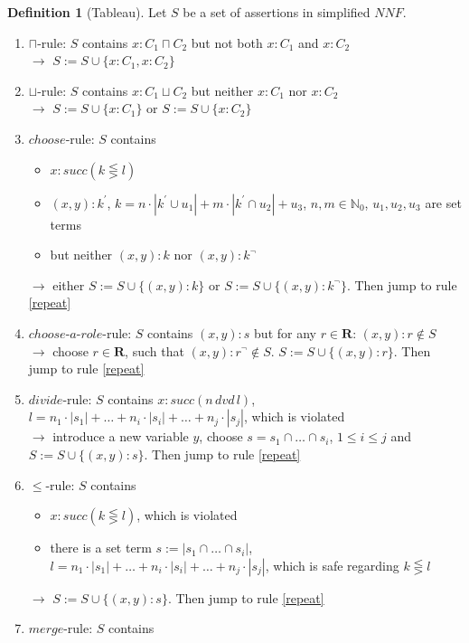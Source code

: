 \documentclass[a4paper,11pt]{scrartcl}
\theoremstyle{break}
\theoremstyle{definition}
\newtheorem{mydef}{Definition}
\begin{document}
\begin{mydef}[Tableau]
Let $S$ be a set of assertions in simplified $NNF$.
\begin{enumerate}
\item\label{cap} $\sqcap$-rule: $S$ contains $x:C_1\sqcap C_2$ but not both $x:C_1$ and $x:C_2$\\
$\rightarrow$ $S:=S\cup\{x:C_1, x:C_2\}$
\item\label{cup} $\sqcup$-rule: $S$ contains $x:C_1\sqcup C_2$ but neither $x:C_1$ nor $x:C_2$\\
$\rightarrow$ $S:=S\cup\{x:C_1\}$ or $S:=S\cup\{x:C_2\}$
\item\label{choose}$choose$-rule: $S$ contains
\begin{itemize}
\item $x:succ(k\lesseqgtr l)$
\item $(x,y):k^\prime$, $k=n\cdot|k^\prime\cup u_1|+m\cdot|k^\prime\cap u_2|+u_3$, $n,m\in\mathbb{N}_0$, $u_1,u_2,u_3$ are set terms
\item but neither $(x,y):k$ nor $(x,y):k^\neg$
\end{itemize}
$\rightarrow$ either $S:=S\cup\{(x,y):k\}$ or $S:=S\cup\{(x,y):k^\neg\}$. Then jump to rule \ref{repeat}
\item\label{chooserole}$choose$-$a$-$role$-rule: $S$ contains $(x,y):s$ but for any $r\in\mathbf{R}$: $(x,y):r\notin S$\\
$\rightarrow$ choose $r\in\mathbf{R}$, such that $(x,y):r^\neg\notin S$. $S:=S\cup\{(x,y):r\}$. Then jump to rule \ref{repeat}
\item\label{dvd}$divide$-rule: $S$ contains $x:succ(n\,dvd\,l)$, $l=n_1\cdot|s_1|+\dots+n_i\cdot|s_i|+\dots+n_j\cdot|s_j|$, which is violated\\
$\rightarrow$ introduce a new variable $y$, choose $s=s_1\cap \dots \cap s_i$, $1\leq i\leq j$ and $S:=S\cup\{(x,y):s\}$. Then jump to rule \ref{repeat}
\item\label{leq}$\leq$-rule: $S$ contains 
\begin{itemize}
\item $x:succ(k\lesseqgtr l)$, which is violated
\item there is a set term $s:=|s_1\cap \dots \cap s_i|$, $l=n_1\cdot|s_1|+\dots+n_i\cdot|s_i|+\dots+n_j\cdot|s_j|$, which is safe regarding $k\lesseqgtr l$
\end{itemize}
$\rightarrow$ $S:=S\cup\{(x,y):s\}$. Then jump to rule \ref{repeat}
\item\label{exceeded}$merge$-rule: $S$ contains
\begin{itemize}

\end{itemize}
\end{enumerate}
\end{mydef}
\end{document}

